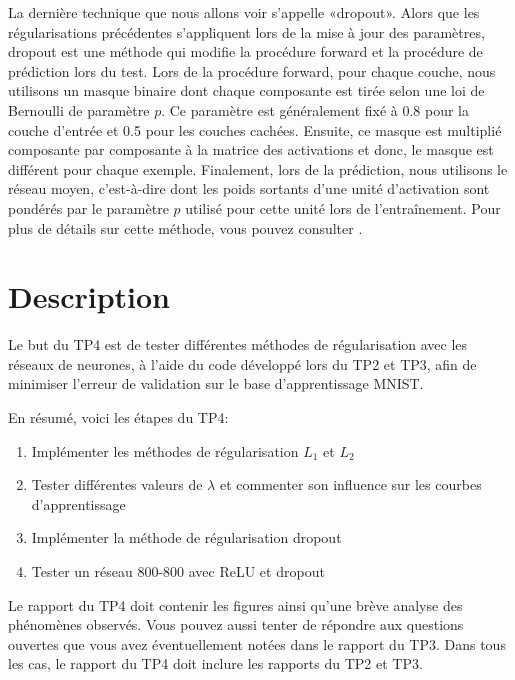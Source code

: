 \documentclass{article}
\begin{document}
La dernière technique que nous allons voir s'appelle «dropout».
Alors que les régularisations précédentes s'appliquent lors de la mise à jour des paramètres, dropout est une méthode qui modifie la procédure forward et la procédure de prédiction lors du test.
Lors de la procédure forward, pour chaque couche, nous utilisons un masque binaire dont chaque composante est tirée selon une loi de Bernoulli de paramètre $p$.
Ce paramètre est généralement fixé à 0.8 pour la couche d'entrée et 0.5 pour les couches cachées.
Ensuite, ce masque est multiplié composante par composante à la matrice des activations et donc, le masque est différent pour chaque exemple.
Finalement, lors de la prédiction, nous utilisons le réseau moyen, c'est-à-dire dont les poids sortants d'une unité d'activation sont pondérés par le paramètre $p$ utilisé pour cette unité lors de l'entraînement.
Pour plus de détails sur cette méthode, vous pouvez consulter \cite{Srivastava:2014}.

\section{Description}
Le but du TP4 est de tester différentes méthodes de régularisation avec les réseaux de neurones, à l'aide du code développé lors du TP2 et TP3, afin de minimiser l'erreur de validation sur le base d'apprentissage MNIST.

En résumé, voici les étapes du TP4:
\begin{enumerate}
\item Implémenter les méthodes de régularisation $L_1$ et $L_2$
\item Tester différentes valeurs de $\lambda$ et commenter son influence sur les courbes d'apprentissage 
\item Implémenter la méthode de régularisation dropout
\item Tester un réseau 800-800 avec ReLU et dropout
\end{enumerate}
Le rapport du TP4 doit contenir les figures ainsi qu'une brève analyse des phénomènes observés.
Vous pouvez aussi tenter de répondre aux questions ouvertes que vous avez éventuellement notées dans le rapport du TP3. 
Dans tous les cas, le rapport du TP4 doit inclure les rapports du TP2 et TP3.
\end{document}
